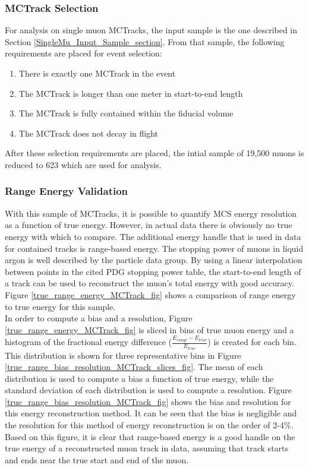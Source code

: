 \subsubsection{MCTrack Selection}\label{MCTrack_Selection_section}
For analysis on single muon {\sc MCTracks}, the input sample is the one described in Section \ref{SingleMu_Input_Sample_section}. From that sample, the following requirements are placed for event selection:
\begin{enumerate}
	\item There is exactly one {\sc MCTrack} in the event
	\item The {\sc MCTrack} is longer than one meter in start-to-end length
	\item The {\sc MCTrack} is fully contained within the fiducial volume
	\item The {\sc MCTrack} does not decay in flight
\end{enumerate}
After these selection requirements are placed, the intial sample of 19,500 muons is reduced to 623 which are used for analysis.

\subsubsection{Range Energy Validation}\label{Range_Energy_Validation_section}
With this sample of {\sc MCTracks}, it is possible to quantify MCS energy resolution as a function of true energy. However, in actual {\ub} data there is obviously no true energy with which to compare. The additional energy handle that is used in data for contained tracks is range-based energy. The stopping power of muons in liquid argon is well described by the particle data group\cite{PDG_spline_table}. By using a linear interpolation between points in the cited PDG stopping power table, the start-to-end length of a track can be used to reconstruct the muon's total energy with good accuracy. Figure \ref{true_range_energy_MCTrack_fig} shows a comparison of range energy to true energy for this sample. \\

In order to compute a bias and a resolution, Figure \ref{true_range_energy_MCTrack_fig} is sliced in bins of true muon energy and a histogram of the fractional energy difference ($\frac{E_{range} - E_{true}}{E_{true}}$) is created for each bin. This distribution is shown for three representative bins in Figure \ref{true_range_bias_resolution_MCTrack_slices_fig}. The mean of each distribution is used to compute a bias a function of true energy, while the standard deviation of each distribution is used to compute a resolution. Figure \ref{true_range_bias_resolution_MCTrack_fig} shows the bias and resolution for this energy reconstruction method. It can be seen that the bias is negligible and the resolution for this method of energy reconstruction is on the order of 2-4\%. Based on this figure, it is clear that range-based energy is a good handle on the true energy of a reconstructed muon track in {\ub} data, assuming that track starts and ends near the true start and end of the muon.

